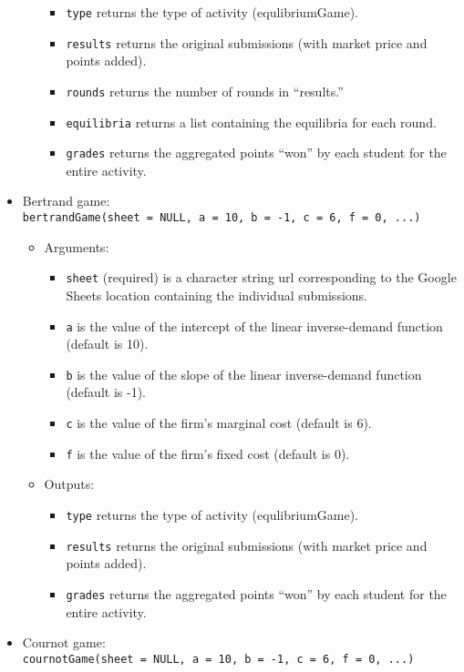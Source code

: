 \documentclass[
]{article}
\providecommand{\tightlist}{%
  \setlength{\itemsep}{0pt}\setlength{\parskip}{0pt}}
\begin{document}
\begin{itemize}
\begin{itemize}
    \begin{itemize}
    \tightlist
    \item
      \texttt{type} returns the type of activity (equlibriumGame).
    \item
      \texttt{results} returns the original submissions (with market
      price and points added).
    \item
      \texttt{rounds} returns the number of rounds in ``results.''
    \item
      \texttt{equilibria} returns a list containing the equilibria for
      each round.
    \item
      \texttt{grades} returns the aggregated points ``won'' by each
      student for the entire activity.
    \end{itemize}
  \end{itemize}
\item
  Bertrand game:
  \texttt{bertrandGame(sheet\ =\ NULL,\ a\ =\ 10,\ b\ =\ -1,\ c\ =\ 6,\ f\ =\ 0,\ ...)}

  \begin{itemize}
  \item
    Arguments:

    \begin{itemize}
    \tightlist
    \item
      \texttt{sheet} (required) is a character string url corresponding
      to the Google Sheets location containing the individual
      submissions.
    \item
      \texttt{a} is the value of the intercept of the linear
      inverse-demand function (default is 10).
    \item
      \texttt{b} is the value of the slope of the linear inverse-demand
      function (default is -1).
    \item
      \texttt{c} is the value of the firm's marginal cost (default is
      6).
    \item
      \texttt{f} is the value of the firm's fixed cost (default is 0).
    \end{itemize}
  \item
    Outputs:

    \begin{itemize}
    \tightlist
    \item
      \texttt{type} returns the type of activity (equlibriumGame).
    \item
      \texttt{results} returns the original submissions (with market
      price and points added).
    \item
      \texttt{grades} returns the aggregated points ``won'' by each
      student for the entire activity.
    \end{itemize}
  \end{itemize}
\item
  Cournot game:
  \texttt{cournotGame(sheet\ =\ NULL,\ a\ =\ 10,\ b\ =\ -1,\ c\ =\ 6,\ f\ =\ 0,\ ...)}


\end{itemize}
\end{document}
